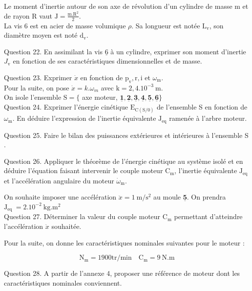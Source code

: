 \documentclass[10pt]{article}
\begin{document}
Le moment d'inertie autour de son axe de révolution d'un cylindre de masse m et de rayon R vaut $\mathrm{J}=\frac{\mathrm{m} . \mathrm{R}^{2}}{2}$.\\
La vis 6 est en acier de masse volumique $\rho$. Sa longueur est notée $\mathrm{L}_{\mathrm{v}}$, son diamètre moyen est noté $\mathrm{d}_{\mathrm{v}}$.

Question 22. En assimilant la vis $\underline{6}$ à un cylindre, exprimer son moment d'inertie $J_{\mathrm{v}}$ en fonction de ses caractéristiques dimensionnelles et de masse.

Question 23. Exprimer $\dot{x}$ en fonction de $\mathrm{p}_{\mathrm{v}}, \mathrm{r}, \mathrm{i}$ et $\omega_{\mathrm{m}}$.\\
Pour la suite, on pose $\dot{x}=k . \omega_{m}$ avec $\mathrm{k}=2,4.10^{-3} \mathrm{~m}$.\\
On isole l'ensemble $\mathrm{S}=\{$ axe moteur, $\underline{\mathbf{1}}, \underline{\mathbf{2}}, \underline{\mathbf{3}}, \underline{\mathbf{4}}, \underline{\mathbf{5}}, \underline{\mathbf{6}}\}$\\
Question 24. Exprimer l'énergie cinétique $\mathrm{E}_{\mathrm{C}(\mathrm{S} / 0)}$ de l'ensemble S en fonction de $\omega_{\mathrm{m}}$. En déduire l'expression de l'inertie équivalente $\mathrm{J}_{\mathrm{eq}}$ ramenée à l'arbre moteur.

Question 25. Faire le bilan des puissances extérieures et intérieures à l'ensemble S .

Question 26. Appliquer le théorème de l'énergie cinétique au système isolé et en déduire l'équation faisant intervenir le couple moteur $\mathrm{C}_{\mathrm{m}}$, l'inertie équivalente $\mathrm{J}_{\mathrm{eq}}$ et l'accélération angulaire du moteur $\dot{\omega}_{\mathrm{m}}$.

On souhaite imposer une accélération $\ddot{x}=1 \mathrm{~m} / \mathrm{s}^{2}$ au moule $\underline{\mathbf{5}}$. On prendra $\mathrm{J}_{\text {eq }}=2.10^{-2} \mathrm{~kg} . \mathrm{m}^{2}$\\
Question 27. Déterminer la valeur du couple moteur $\mathrm{C}_{\mathrm{m}}$ permettant d'atteindre l'accélération $\ddot{x}$ souhaitée.

Pour la suite, on donne les caractéristiques nominales suivantes pour le moteur :

$$
\mathrm{N}_{\mathrm{m}}=1900 \mathrm{tr} / \mathrm{min} \quad \mathrm{C}_{\mathrm{m}}=9 \mathrm{~N} . \mathrm{m}
$$

Question 28. A partir de l'annexe 4, proposer une référence de moteur dont les caractéristiques nominales conviennent.
\end{document}
